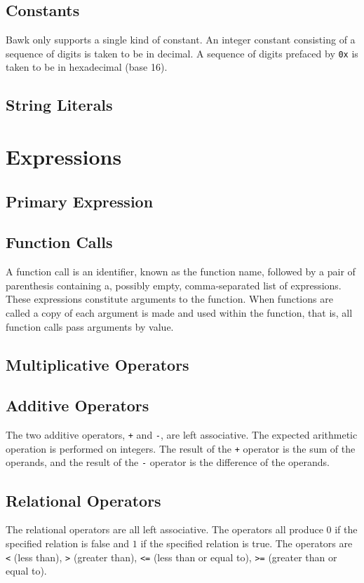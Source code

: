 \documentclass[letterpaper]{article}
\begin{document}
\subsection{Constants}
Bawk only supports a single kind of constant.  An integer constant consisting of a sequence of digits is taken to be in decimal.  A sequence of digits prefaced by \texttt{0x} is taken to be in hexadecimal (base 16).


\subsection{String Literals}

\section{Expressions}

\subsection{Primary Expression}

\subsection{Function Calls}
A function call is an identifier, known as the function name, followed by a pair of parenthesis containing a, possibly empty, comma-separated list of expressions.  These expressions constitute arguments to the function.  When functions are called a copy of each argument is made and used within the function, that is, all function calls pass arguments by value.

\subsection{Multiplicative Operators}

\subsection{Additive Operators}
The two additive operators, \texttt{+} and \texttt{-}, are left associative.  The expected arithmetic operation is performed on integers.  The result of the \texttt{+} operator is the sum of the operands, and the result of the \texttt{-} operator is the difference of the operands.


\subsection{Relational Operators}
The relational operators are all left associative.  The operators all produce $0$ if the specified relation is false and $1$ if the specified relation is true.  The operators are \texttt{<} (less than), \texttt{>} (greater than), \texttt{<=} (less than or equal to), \texttt{>=} (greater than or equal to).
\end{document}
